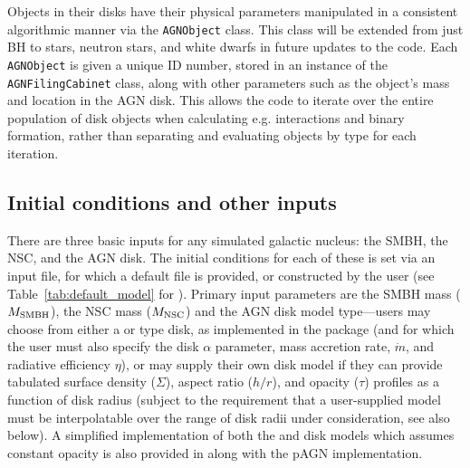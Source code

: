 Objects in their disks have their physical parameters manipulated in a consistent algorithmic manner via the \verb|AGNObject| class.
This class will be extended from just BH to stars, neutron stars, and white dwarfs in future updates to the code.
Each \verb|AGNObject| is given a unique ID number, stored in an instance of the \verb|AGNFilingCabinet| class, along with other parameters such as the object's mass and location in the AGN disk.
This allows the code to iterate over the entire population of disk objects when calculating e.g. interactions and binary formation, rather than separating and evaluating objects by type for each iteration.

\subsection{Initial conditions and other inputs}
There are three basic inputs for any simulated galactic nucleus: the SMBH, the NSC, and the AGN disk.
The initial conditions for each of these is set via an input file, for which a default file is provided, or constructed by the user (see Table~\ref{tab:default_model} for ).
Primary input parameters are the SMBH mass ($M_{\rm SMBH}$), the NSC mass ($M_{\rm NSC}$) and the AGN disk model type---users may choose from either a \cite{SirkoGoodman03} or \cite{ThompsonQuataertMurray05} type disk, as implemented in the  package \citep{Gangardt+24-pAGN} (and for which the user must also specify the disk $\alpha$ parameter, mass accretion rate, $\dot{m}$, and radiative efficiency $\eta$), or may supply their own disk model if they can provide tabulated surface density ($\Sigma$), aspect ratio ($h/r$), and opacity ($\tau$) profiles as a function of disk radius (subject to the requirement that a user-supplied model must be interpolatable over the range of disk radii under consideration, see also below).
A simplified implementation of both the \cite{SirkoGoodman03} and \cite{ThompsonQuataertMurray05} disk models which assumes constant opacity is also provided in  along with the pAGN implementation.

